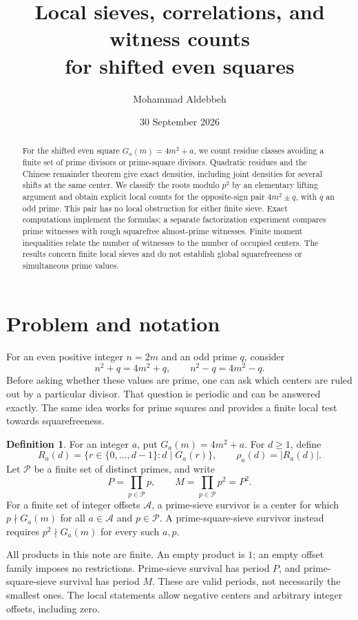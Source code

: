 \documentclass[11pt]{article}
\title{Local sieves, correlations, and witness counts\\for shifted even squares}
\author{Mohammad Aldebbeh}
\date{30 September 2026}
\theoremstyle{definition}
\newtheorem{definition}[theorem]{Definition}
\theoremstyle{remark}
\newcommand{\Pset}{\mathcal P}
\begin{document}
\maketitle
\begin{abstract}
For the shifted even square $G_a(m)=4m^2+a$, we count residue classes
avoiding a finite set of prime divisors or prime-square divisors.
Quadratic residues and the Chinese remainder theorem give exact
densities, including joint densities for several shifts at the same
center. We classify the roots modulo $p^2$ by an elementary lifting
argument and obtain explicit local counts for the opposite-sign pair
$4m^2\pm q$, with $q$ an odd prime. This pair has no local obstruction
for either finite sieve. Exact computations implement the formulas;
a separate factorization experiment compares prime witnesses with
rough squarefree almost-prime witnesses. Finite moment inequalities
relate the number of witnesses to the number of occupied centers.
The results concern finite local sieves and do not establish global
squarefreeness or simultaneous prime values.
\end{abstract}
\tableofcontents

\section{Problem and notation}
For an even positive integer $n=2m$ and an odd prime $q$, consider
\[
 n^2+q=4m^2+q,\qquad n^2-q=4m^2-q.
\]
Before asking whether these values are prime, one can ask which centers
are ruled out by a particular divisor. That question is periodic and
can be answered exactly. The same idea works for prime squares and
provides a finite local test towards squarefreeness.

\begin{definition}
For an integer $a$, put $G_a(m)=4m^2+a$. For $d\ge1$, define
\[
 R_a(d)=\{r\in\{0,\ldots,d-1\}:d\mid G_a(r)\},
 \qquad \rho_a(d)=|R_a(d)|.
\]
Let $\Pset$ be a finite set of distinct primes, and write
\[
 P=\prod_{p\in\Pset}p,\qquad M=\prod_{p\in\Pset}p^2=P^2.
\]
For a finite set of integer offsets $\mathcal A$, a prime-sieve survivor
is a center for which $p\nmid G_a(m)$ for all $a\in\mathcal A$ and
$p\in\Pset$. A prime-square-sieve survivor instead requires
$p^2\nmid G_a(m)$ for every such $a,p$.
\end{definition}

All products in this note are finite. An empty product is $1$;
an empty offset family imposes no restrictions. Prime-sieve survival
has period $P$, and prime-square-sieve survival has period $M$.
These are valid periods, not necessarily the smallest ones.
The local statements allow negative centers and arbitrary integer
offsets, including zero.
\end{document}
